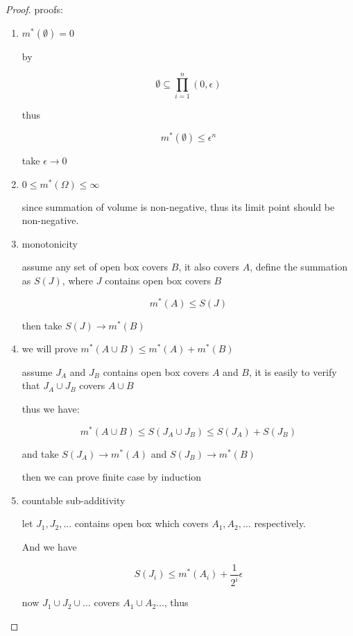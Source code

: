 \begin{proof}
    proofs:

    \begin{enumerate}
        \item $m^*(\emptyset) = 0$
        
        by

        \[
            \emptyset \subseteq \prod_{i=1}^{n}(0,\epsilon)
        \]

        thus

        \[
            m^*(\emptyset) \le \epsilon^n
        \]

        take $\epsilon \to 0$

        \item $0 \le m^*(\Omega) \le \infty$

        since summation of volume is non-negative, thus its limit point should be non-negative.

        \item monotonicity

        assume any set of open box covers $B$, it also covers $A$, define the summation as $S(J)$,
        where $J$ contains open box covers $B$

        \[
            m^*(A) \le S(J)
        \]

        then take $S(J) \to m^*(B)$

        \item we will prove $m^*(A \cup B) \le m^*(A) + m^*(B)$

        assume $J_A$ and $J_B$ contains open box covers $A$ and $B$, it is easily to verify that
        $J_A \cup J_B$ covers $A \cup B$

        thus we have:

        \[
            m^*(A\cup B)\le S(J_A \cup J_B) \le S(J_A) + S(J_B)
        \]

        and take $S(J_A) \to m^*(A)$ and $S(J_B) \to m^*(B)$

        then we can prove finite case by induction

        \item countable sub-additivity

        let $J_1, J_2, ...$ contains open box which covers $A_1, A_2, ...$ respectively.

        And we have
        
        \[
        S(J_i) \le m^*(A_i) + \frac{1}{2^i} \epsilon
        \]

        
        now $J_1 \cup J_2 \cup ... $ covers $A_1 \cup A_2 ...$, thus


\end{enumerate}
\end{proof}
